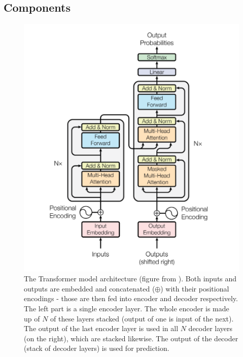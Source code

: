 
\subsection{Components}

\begin{figure}[h!]
	\includegraphics[width=\linewidth]{"pictures/the-transformer-model-architecture.png"} %
	\caption{The Transformer model architecture (figure from \cite{attention_is_all_you_need}). Both inputs and outputs are embedded and concatenated (\(\oplus\)) with their positional encodings - those are then fed into encoder and decoder respectively. The left part is a single encoder layer. The whole encoder is made up of \(N\) of these layers stacked (output of one is input of the next). The output of the last encoder layer is used in all \(N\) decoder layers (on the right), which are stacked likewise. The output of the decoder (stack of decoder layers) is used for prediction.}

	\label{fig:transformer_architecture_fig}
\end{figure}

